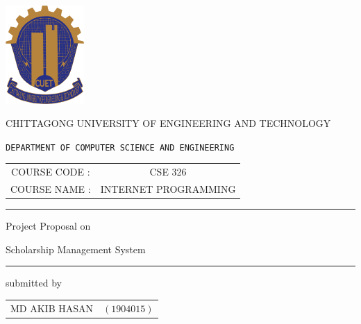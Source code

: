 \documentclass[a4paper,11pt]{report}
\begin{document}
\begin{titlepage}
\scshape
\centering

\includegraphics[width=3cm, keepaspectratio]{cuet.png} \par \vspace{0.1cm}
\begin{Large}
	CHITTAGONG UNIVERSITY OF ENGINEERING AND TECHNOLOGY
\end{Large}
\par
\texttt{DEPARTMENT OF COMPUTER SCIENCE AND ENGINEERING}
\vspace{2cm}

\begin{tabular}{cc}
	COURSE CODE : & CSE 326                 \\
	COURSE NAME : & INTERNET PROGRAMMING
\end{tabular}
\vspace{1cm}

\raisebox{-\baselineskip}{\rule{\textwidth}{1px}}
\rule{\textwidth}{1px}

\vspace{0.2cm}
{\Large{{Project Proposal on}}}\par \vspace{0.5cm}
\huge{{Scholarship Management System }}
\rule{\textwidth}{2px}


\vspace{2cm}
\normalsize

\parbox[l]{8cm}{
	\begin{center}
		submitted by
	\end{center}

	\begin{tabular}{cl}
		MD AKIB HASAN & $(1904015)$\\
		


\end{tabular}}
\end{titlepage}
\end{document}
